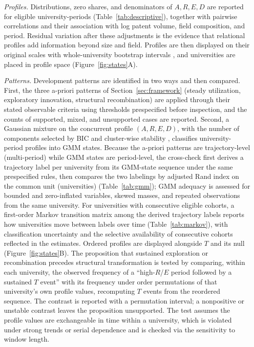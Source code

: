 \emph{Profiles.} Distributions, zero shares, and denominators of $A,R,E,D$ are
reported for eligible university-periods (Table~\ref{tab:descriptive}), together
with pairwise correlations and their association with log patent volume, field
composition, and period. Residual variation after these adjustments is the
evidence that relational profiles add information beyond size and field.
Profiles are then displayed on their original scales with whole-university
bootstrap intervals \citep{efron1979}, and universities are placed in profile
space (Figure~\ref{fig:states}A).

\emph{Patterns.} Development patterns are identified in two ways and then
compared. First, the three a-priori patterns of Section~\ref{sec:framework}
(steady utilization, exploratory innovation, structural recombination) are
applied through their stated observable criteria using thresholds prespecified
before inspection, and the counts of supported, mixed, and unsupported cases
are reported. Second, a Gaussian mixture on the concurrent profile
$(A,R,E,D)$, with the number of components selected by BIC and cluster-wise
stability \citep{fraley2002,hennig2007}, classifies university-period
profiles into GMM states. Because the a-priori patterns are trajectory-level
(multi-period) while GMM states are period-level, the cross-check first
derives a trajectory label per university from its GMM-state sequence under the
same prespecified rules, then compares the two labelings by adjusted Rand
index on the common unit (universities) (Table~\ref{tab:gmm}); GMM adequacy
is assessed for bounded and zero-inflated variables, skewed masses, and
repeated observations from the same university. For universities with
consecutive eligible cohorts, a first-order Markov transition matrix among
the derived trajectory labels reports how universities move between labels
over time (Table~\ref{tab:markov}), with classification uncertainty and the
selective availability of consecutive cohorts reflected in the estimates.
Ordered profiles are displayed alongside $T$ and its
null (Figure~\ref{fig:states}B). The proposition that sustained exploration or
recombination precedes structural transformation is tested by comparing,
within each university, the observed frequency of a ``high-$R$/$E$ period
followed by a sustained $T$ event'' with its frequency under order
permutations of that university's own profile values, recomputing $T$ events
from the reordered sequence. The contrast is reported with a permutation
interval; a nonpositive or unstable contrast leaves the proposition
unsupported. The test assumes the profile values are exchangeable in time
within a university, which is violated under strong trends or serial
dependence and is checked via the sensitivity to window length.

